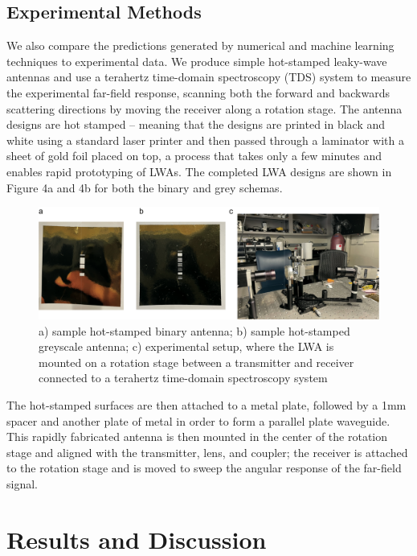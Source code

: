 \documentclass[11pt]{article}
\begin{document}
\subsection*{Experimental Methods}

\noindent We also compare the predictions generated by numerical and machine learning techniques to experimental data. We produce simple hot-stamped leaky-wave antennas \cite{Guerboukha:21} and use a terahertz time-domain spectroscopy (TDS) system to measure the experimental far-field response, scanning both the forward and backwards scattering directions by moving the receiver along a rotation stage. The antenna designs are hot stamped -- meaning that the designs are printed in black and white using a standard laser printer and then passed through a laminator with a sheet of gold foil placed on top, a process that takes only a few minutes and enables rapid prototyping of LWAs. The completed LWA designs are shown in Figure 4a and 4b for both the binary and grey schemas. 

\begin{figure}[H]
	\centering
	\includegraphics[width=6in]{figures/setuppdf2}
	\caption{a) sample hot-stamped binary antenna; b) sample hot-stamped greyscale antenna; c) experimental setup, where the LWA is mounted on a rotation stage between a transmitter and receiver connected to a terahertz time-domain spectroscopy system}
\end{figure}

\noindent The hot-stamped surfaces are then attached to a metal plate, followed by a 1mm spacer and another plate of metal in order to form a parallel plate waveguide. This rapidly fabricated antenna is then mounted in the center of the rotation stage and aligned with the transmitter, lens, and coupler; the receiver is attached to the rotation stage and is moved to sweep the angular response of the far-field signal.

\section*{Results and Discussion}
\end{document}
